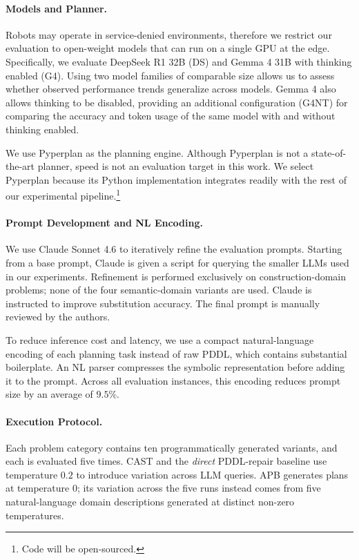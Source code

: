 \paragraph{Models and Planner.} Robots may operate in service-denied environments, therefore we restrict our evaluation to open-weight models that can run on a single GPU at the edge. Specifically, we evaluate DeepSeek R1 32B (DS) and Gemma 4 31B with thinking enabled (G4). Using two model families of comparable size allows us to assess whether observed performance trends generalize across models. Gemma 4 also allows thinking to be disabled, providing an additional configuration (G4NT) for comparing the accuracy and token usage of the same model with and without thinking enabled.

We use Pyperplan \cite{alkhazraji-et-al-zenodo2020} as the planning engine. Although Pyperplan is not a state-of-the-art planner, speed is not an evaluation target in this work. We select Pyperplan because its Python implementation integrates readily with the rest of our experimental pipeline.\footnote{Code will be open-sourced.}

\paragraph{Prompt Development and NL Encoding.}
We use Claude Sonnet 4.6 to iteratively refine the evaluation prompts. Starting from a base prompt, Claude is given a script for querying the smaller LLMs used in our experiments. Refinement is performed exclusively on construction-domain problems; none of the four semantic-domain variants are used. Claude is instructed to improve substitution accuracy. The final prompt is manually reviewed by the authors.

To reduce inference cost and latency, we use a compact natural-language encoding of each planning task instead of raw PDDL, which contains substantial boilerplate. An NL parser compresses the symbolic representation before adding it to the prompt. Across all evaluation instances, this encoding reduces prompt size by an average of $9.5\%$.

\paragraph{Execution Protocol.}Each problem category contains ten programmatically generated variants, and each is evaluated five times. CAST and the \emph{direct} PDDL-repair baseline use temperature $0.2$ to introduce variation across LLM queries. APB generates plans at temperature $0$; its variation across the five runs instead comes from five natural-language domain descriptions generated at distinct non-zero temperatures.

